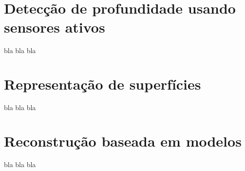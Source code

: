 \documentclass{article}
\begin{document}
\section{Detecção de profundidade usando sensores ativos}

bla bla bla

\section{Representação de superfícies}

bla bla bla

\section{Reconstrução baseada em modelos}

bla bla bla

\small


\end{document}
